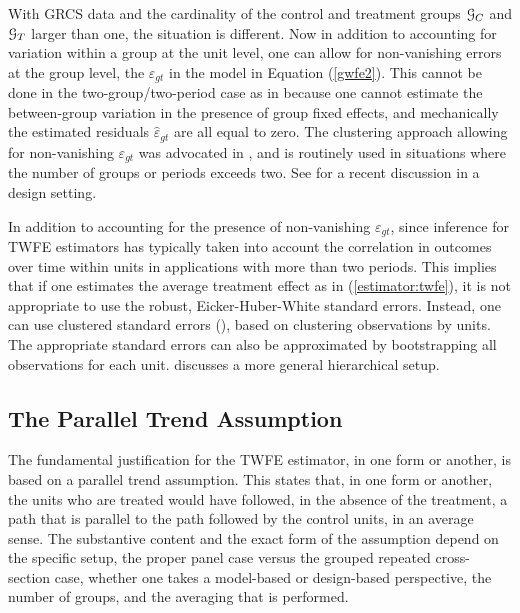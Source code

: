 \documentclass[letterpaper,12pt,leqno]{article}
\begin{document}
With GRCS data and the cardinality of  the
control and treatment groups ${\cal G}_C$ and ${\cal G}_T$ larger than one, the situation is different. Now in addition to accounting for variation within a group at the unit level, one can allow for non-vanishing errors at the group level, the $\varepsilon_{gt}$ in the model in Equation (\ref{gwfe2}). 
This cannot be done in the two-group/two-period case as in \cite{card1994minimum} because one cannot estimate the between-group variation in the presence of group fixed effects, and mechanically the estimated residuals $\hat\varepsilon_{gt}$ are all equal to zero.
The clustering approach allowing for non-vanishing $\varepsilon_{gt}$ was advocated in  \citep{liang1986longitudinal, manuel1987computing, Bertrand2004did, donald2007inference, ibragimov2016inference}, and is routinely used in situations where the number of groups or periods exceeds two. See \citep{abadie2023should} for a recent discussion in a design setting.

In addition to accounting for the presence of non-vanishing $\varepsilon_{gt}$, since  \citep{Bertrand2004did} inference for TWFE estimators has typically taken into account the correlation in outcomes over time within units in applications with more than two periods. This implies that if one estimates the average treatment effect as in (\ref{estimator:twfe}), it is not appropriate to use the robust, Eicker-Huber-White standard errors. Instead, one can use clustered standard errors (\citealp{liang1986longitudinal, manuel1987computing}), based on clustering observations by units.
The appropriate standard errors can also be approximated by bootstrapping all observations for each unit. \cite{hansen2007generalized} discusses a more general hierarchical setup.

\subsection{The Parallel Trend Assumption}\label{sec:par_trends}


The fundamental justification for the TWFE estimator, in one form or another, is based on a parallel trend assumption. This states that, in one form or another, the units who are treated would have followed, in the absence of the treatment, a path that is parallel to the path followed by the control units, in an average sense. The substantive content and the exact form of the assumption depend on the specific setup, the proper panel case versus the grouped repeated cross-section case, whether one takes a model-based or design-based perspective, the number of groups, and the averaging that is performed. 
\end{document}
